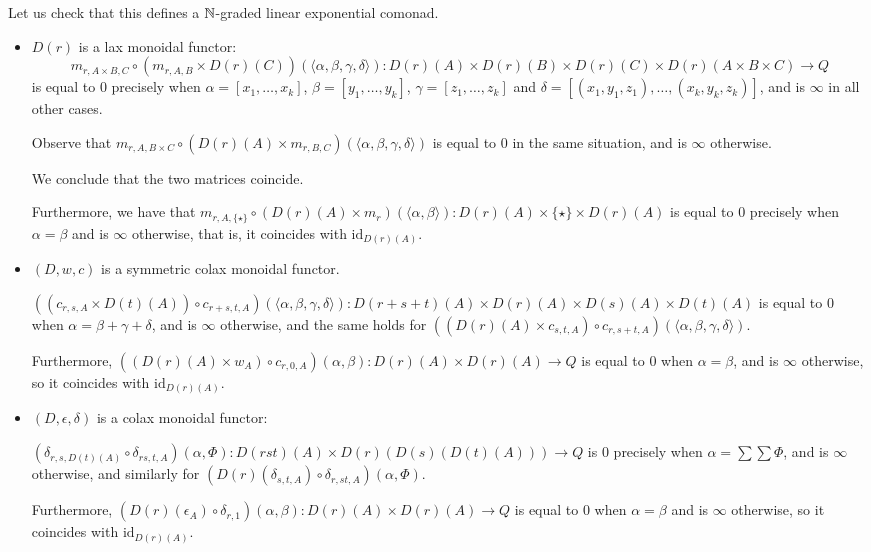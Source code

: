 Let us check that this defines a $\mathbb{N}$-graded linear exponential comonad.

\begin{itemize}

\item $D(r)$ is a lax monoidal functor:
 $$ m_{r,A\times B,C}\circ (m_{r,A,B}\times D(r)(C))(\langle \alpha,\beta,\gamma,\delta\rangle)
 :
 D(r)(A)\times D(r)(B)\times D(r)(C) \times D(r)(A\times B\times C)\to Q
 $$
 is equal to $0$ 
precisely when $\alpha=[x_{1},\dots, x_{k}]$, $\beta=[y_{1},\dots, y_{k}]$, $\gamma=[z_{1},\dots, z_{k}]$ and 
$\delta= [(x_{1},y_{1},z_{1}),\dots, (x_{k},y_{k},z_{k})]$, and is $\infty $ in all other cases.

Observe that
$m_{r,A,B\times C}\circ (D(r)(A)\times m_{r,B,C})(\langle\alpha,\beta,\gamma, \delta\rangle)
  $ is equal to $0$ in the same situation, and is $\infty$ otherwise.
 
 We conclude that the two matrices coincide.
 
 Furthermore, we have that 
 $m_{r,A,\{\star\}}\circ (D(r)(A)\times m_{r})(\langle \alpha,\beta\rangle): D(r)(A)\times \{\star\} \times D(r)(A)$ is equal to $0$ 
 precisely when $\alpha=\beta$ and is $\infty$ otherwise, that is, it coincides with $\mathrm{id}_{D(r)(A)}$. 
 


\item $(D,w,c)$ is a symmetric colax monoidal functor.


$((c_{r,s,A}\times D(t)(A))\circ c_{r+s,t,A}) (\langle \alpha,\beta,\gamma,\delta\rangle)
: D(r+s+t)(A)\times D(r)(A)\times D(s)(A)\times D(t)(A)$
is equal to $0$ when $\alpha=\beta+\gamma+\delta$, and is $\infty$ otherwise, and the same holds for
$((D(r)(A)\times c_{s,t,A})\circ c_{r,s+t,A}) (\langle \alpha,\beta,\gamma,\delta\rangle)
$.

Furthermore, 
$((D(r)(A)\times w_{A})\circ c_{r,0,A})(\alpha,\beta)
: D(r)(A)\times D(r)(A)\to Q$ is equal to $0$ when 
$\alpha=\beta$, and is $\infty$ otherwise, so it coincides with 
$\mathrm{id}_{D(r)(A)}$.

\item $(D,\epsilon,\delta)$ is a colax monoidal functor:

$(\delta_{r,s,D(t)(A)}\circ \delta_{rs,t,A})
(\alpha, \Phi)
: D(rst)(A) \times D(r)(D(s)(D(t)(A))) \to Q
$
is $0$ precisely when $\alpha = \sum \sum \Phi$, and is $\infty$ otherwise, and similarly for 
$(D(r)(\delta_{s,t,A})\circ \delta_{r,st,A})(\alpha,\Phi)$.


Furthermore, 
$(D(r)(\epsilon_{A})\circ \delta_{r,1})( \alpha,\beta ):
D(r)(A) \times D(r)(A)\to Q
$ is equal to $0$ when $\alpha=\beta$ and is $\infty$ otherwise, so it coincides with $\mathrm{id}_{D(r)(A)}$.


\end{itemize}


